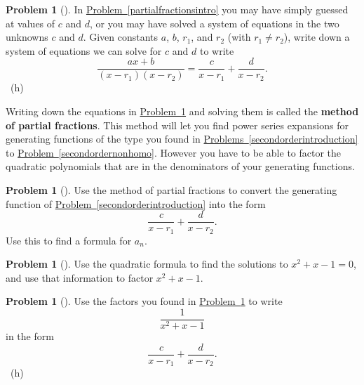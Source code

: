 \documentclass[10pt,]{book}
\newcommand{\terminology}[1]{\textbf{#1}}
\theoremstyle{plain}
\theoremstyle{definition}
\newtheorem{activity}[project]{Problem}
\theoremstyle{definition}
\numberwithin{equation}{chapter}
\begin{document}
\begin{activity}[] \label{partialfractions1}
\hypertarget{p-1250}{}%
In \hyperref[partialfractionsintro]{Problem~\ref{partialfractionsintro}} you may have simply guessed at values of \(c\) and \(d\), or you may have solved a system of equations in the two unknowns \(c\) and \(d\). Given constants \(a\), \(b\), \(r_1\), and \(r_2\) (with \(r_1\not= r_2\)), write down a system of equations we can solve for \(c\) and \(d\) to write%
\begin{equation*}
\frac{ax+b}{(x-r_1)(x-r_2)} = \frac{c}{x-r_1} + \frac{d}{x-r_2}\text{.}
\end{equation*}
%
~{\tiny (h)}\end{activity}
\hypertarget{p-1253}{}%
Writing down the equations in \hyperref[partialfractions1]{Problem~\ref{partialfractions1}} and solving them is called the \terminology{method of partial fractions}. This method will let you find power series expansions for generating functions of the type you found in \hyperref[secondorderintroduction]{Problems~\ref{secondorderintroduction}} to \hyperref[secondordernonhomo]{Problem~\ref{secondordernonhomo}}. However you have to be able to factor the quadratic polynomials that are in the denominators of your generating functions.%
\begin{activity}[] \label{activity-219}
\hypertarget{p-1254}{}%
Use the method of partial fractions to convert the generating function of \hyperref[secondorderintroduction]{Problem~\ref{secondorderintroduction}} into the form%
\begin{equation*}
\frac{c}{x-r_1} + \frac{d}{x-r_2}\text{.}
\end{equation*}
Use this to find a formula for \(a_n\).%
\end{activity}
\begin{activity}[] \label{factorFibonacci}
\hypertarget{p-1256}{}%
Use the quadratic formula to find the solutions to \(x^2+x-1=0\), and use that information to factor \(x^2+x-1\).%
\end{activity}
\begin{activity}[] \label{fractionFibonacci}
\hypertarget{p-1258}{}%
Use the factors you found in \hyperref[factorFibonacci]{Problem~\ref{factorFibonacci}} to write%
\begin{equation*}
\frac{1}{x^2+x-1}
\end{equation*}
in the form%
\begin{equation*}
\frac{c}{x-r_1} + \frac{d}{x-r_2}.
\end{equation*}
%
~{\tiny (h)}\end{activity}
\end{document}
